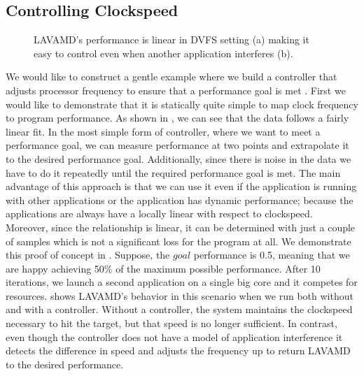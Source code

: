 \subsection{Controlling Clockspeed}
\begin{figure}
  \subfloat[]
  {
    
    \label{fig:lavamd_control}
  }
 \label{fig:freq-control}
 \caption{LAVAMD's performance is linear in DVFS setting (a) making it
   easy to control even when another application interferes (b).}
\end{figure}

We would like to construct a gentle example where we build a
controller that adjusts processor frequency to ensure that a
performance goal is met \cite{lefurgy}. First we would like to
demonstrate that it is statically quite simple to map clock frequency
to program performance. As shown in , we can
see that the data follows a fairly linear fit. In the most simple form
of controller, where we want to meet a performance goal, we can
measure performance at two points and extrapolate it to the desired
performance goal. Additionally, since there is noise in the data we
have to do it repeatedly until the required performance goal is met.
The main advantage of this approach is that we can use it even if the
application is running with other applications or the application has
dynamic performance; because the applications are always have a
locally linear with respect to clockspeed. Moreover, since the
relationship is linear, it can be determined with just a couple of
samples which is not a significant loss for the program at all. We
demonstrate this proof of concept in .
Suppose, the $goal$ performance is 0.5, meaning that we are happy
achieving 50\% of the maximum possible performance. After 10
iterations, we launch a second application on a single big core and it
competes for resources.   shows LAVAMD's
behavior in this scenario when we run both without and with a
controller.  Without a controller, the system maintains the clockspeed
necessary to hit the target, but that speed is no longer sufficient.
In contrast, even though the controller does not have a model of
application interference it detects the difference in speed and
adjusts the frequency up to return LAVAMD to the desired performance.

